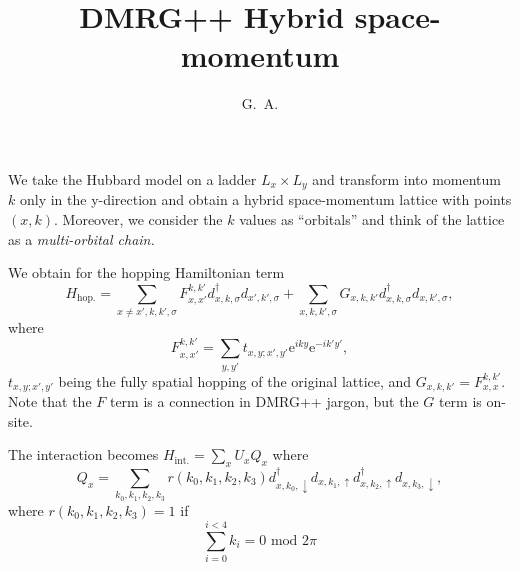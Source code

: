 \documentclass{article}
\begin{document}
\title{DMRG++ Hybrid space-momentum}
\author{G.~A.}
\maketitle

We take the Hubbard model on a ladder $L_x\times L_y$ and transform into momentum $k$ only
in the y-direction and obtain a hybrid space-momentum lattice with points $(x, k)$.
Moreover, we consider the $k$ values as ``orbitals'' and think of the lattice as a 
\emph{multi-orbital chain.}

We obtain for the hopping Hamiltonian term
\begin{equation}
H_{\textrm{hop.}}=\sum_{x\neq x',k,k',\sigma} F^{k, k'}_{x,x'} d^\dagger_{x, k, \sigma} d_{x',k',\sigma}
+ \sum_{x, k, k', \sigma} G_{x, k, k'}d^\dagger_{x, k, \sigma} d_{x,k',\sigma},
\end{equation}
where
\begin{equation}
F^{k, k'}_{x, x'} = \sum_{y, y'} t_{x,y; x',y'}\textrm{e}^{i k y} \textrm{e}^{-i k' y'},
\end{equation}
$t_{x,y; x',y'}$ being the fully spatial hopping of the original lattice,
and $G_{x, k, k'} = F^{k, k'}_{x, x}$. Note that the $F$ term is a connection in DMRG++ jargon,
but the $G$ term is on-site.

The interaction becomes $H_{\textrm{int.}} = \sum_x U_x Q_x$ where
\begin{equation}
Q_x = \sum_{k_0, k_1, k_2, k_3} r(k_0, k_1, k_2, k_3)
d^\dagger_{x,k_0,\downarrow} d_{x, k_1, \uparrow} d^\dagger_{x,k_2,\uparrow} 
d_{x, k_3, \downarrow},
\end{equation}
where $r(k_0, k_1, k_2, k_3)  = 1$ if 
\begin{equation}
\sum_{i=0}^{i < 4} k_i  = 0 \textrm{ mod }2\pi
\end{equation}
\end{document}
